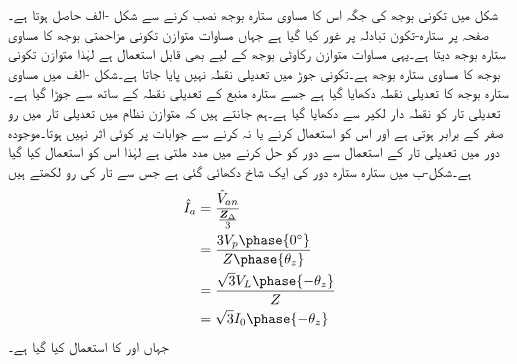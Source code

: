 شکل  میں تکونی بوجھ کی جگہ اس کا مساوی ستارہ بوجھ نصب کرنے سے شکل -الف  حاصل ہوتا ہے۔صفحہ  پر ستارہ-تکون تبادلہ پر غور کیا گیا ہے جہاں مساوات  متوازن تکونی مزاحمتی بوجھ کا مساوی ستارہ بوجھ دیتا ہے۔یہی مساوات متوازن رکاوٹی بوجھ کے لیے بھی قابل استعمال ہے لہٰذا متوازن تکونی بوجھ کا مساوی ستارہ بوجھ  ہے۔تکونی جوڑ میں تعدیلی نقطہ  نہیں پایا جاتا ہے۔شکل -الف میں مساوی ستارہ بوجھ کا تعدیلی نقطہ  دکھایا گیا ہے جسے ستارہ منبع کے تعدیلی نقطہ  کے ساتھ سے جوڑا گیا ہے۔تعدیلی تار کو نقطہ دار لکیر سے دکھایا گیا ہے۔ہم جانتے ہیں کہ متوازن نظام میں تعدیلی تار میں رو صفر کے برابر ہوتی ہے اور اس کو استعمال کرنے یا نہ کرنے سے جوابات پر کوئی اثر نہیں ہوتا۔موجودہ دور میں تعدیلی تار کے استعمال سے دور کو حل کرنے میں مدد ملتی ہے لہٰذا اس کو استعمال کیا گیا ہے۔شکل-ب میں ستارہ ستارہ دور کی ایک شاخ دکھائی گئی ہے جس سے تار کی رو لکھتے ہیں
\begin{align*}
\hat{I}_a&=\frac{\hat{V}_{an}}{\frac{\bZ_{\Delta}}{3}}\\
&=\frac{3V_p\phase{0^{\circ}}}{Z\phase{\theta_z}}\\
&=\frac{\sqrt{3}V_L\phase{-\theta_z}}{Z}\\
&=\sqrt{3}I_0\phase{-\theta_z}
\end{align*}
جہاں  اور  کا استعمال کیا گیا ہے۔


